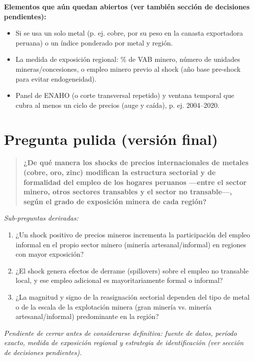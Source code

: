 \documentclass[11pt]{article}
\begin{document}
\textbf{Elementos que aún quedan abiertos (ver también sección de decisiones pendientes):}
\begin{itemize}
  \item Si se usa un solo metal (p. ej. cobre, por su peso en la canasta exportadora peruana) o un índice ponderado por metal y región.
  \item La medida de exposición regional: \% de VAB minero, número de unidades mineras/concesiones, o empleo minero previo al shock (año base pre-shock para evitar endogeneidad).
  \item Panel de ENAHO (o corte transversal repetido) y ventana temporal que cubra al menos un ciclo de precios (auge y caída), p. ej. 2004–2020.
\end{itemize}

\section{Pregunta pulida (versión final)}
\begin{quote}
\textbf{¿De qué manera los shocks de precios internacionales de metales (cobre, oro, zinc)
modifican la estructura sectorial y de formalidad del empleo de los hogares peruanos
—entre el sector minero, otros sectores transables y el sector no transable—,
según el grado de exposición minera de cada región?}
\end{quote}

\textit{Sub-preguntas derivadas:}
\begin{enumerate}[label=(\alph*)]
  \item ¿Un shock positivo de precios mineros incrementa la participación del empleo informal en el propio sector minero (minería artesanal/informal) en regiones con mayor exposición?
  \item ¿El shock genera efectos de derrame (spillovers) sobre el empleo no transable local, y ese empleo adicional es mayoritariamente formal o informal?
  \item ¿La magnitud y signo de la reasignación sectorial dependen del tipo de metal o de la escala de la explotación minera (gran minería vs. minería artesanal/informal) predominante en la región?
\end{enumerate}

\emph{Pendiente de cerrar antes de considerarse definitiva: fuente de datos, período exacto,
medida de exposición regional y estrategia de identificación (ver sección de decisiones
pendientes).}
\end{document}
